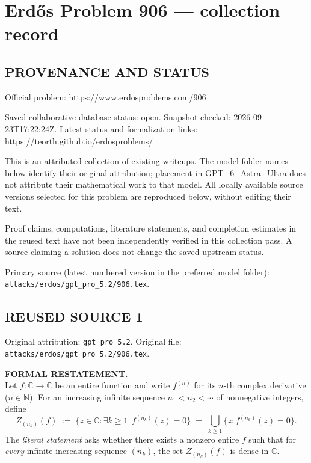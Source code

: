 \section*{Erd\H{o}s Problem 906 --- collection record}

\subsection*{PROVENANCE AND STATUS}
Official problem: https://www.erdosproblems.com/906

Saved collaborative-database status: open.
Snapshot checked: 2026-09-23T17:22:24Z.
Latest status and formalization links: https://teorth.github.io/erdosproblems/

This is an attributed collection of existing writeups. The model-folder names below identify their original attribution; placement in GPT\_6\_Astra\_Ultra does not attribute their mathematical work to that model. All locally available source versions selected for this problem are reproduced below, without editing their text.

Proof claims, computations, literature statements, and completion estimates in the reused text have not been independently verified in this collection pass. A source claiming a solution does not change the saved upstream status.

Primary source (latest numbered version in the preferred model folder): \texttt{attacks/erdos/gpt\_pro\_5.2/906.tex}.

\subsection*{REUSED SOURCE 1}
Original attribution: \texttt{gpt\_pro\_5.2}.
Original file: \texttt{attacks/erdos/gpt\_pro\_5.2/906.tex}.


\noindent\textbf{FORMAL RESTATEMENT.}\\
Let $f:\mathbb{C}\to\mathbb{C}$ be an entire function and write $f^{(n)}$ for its $n$-th complex derivative ($n\in\mathbb{N}$).  For an increasing infinite sequence $n_1<n_2<\cdots$ of nonnegative integers, define
\[
Z_{(n_k)}(f)\;:=\;\big\{z\in\mathbb{C}:\exists k\ge 1\ \ f^{(n_k)}(z)=0\big\}\;=\;\bigcup_{k\ge1} \{z: f^{(n_k)}(z)=0\}.
\]
The \emph{literal statement} asks whether there exists a nonzero entire $f$ such that for \emph{every} infinite increasing sequence $(n_k)$, the set $Z_{(n_k)}(f)$ is dense in $\mathbb{C}$.

